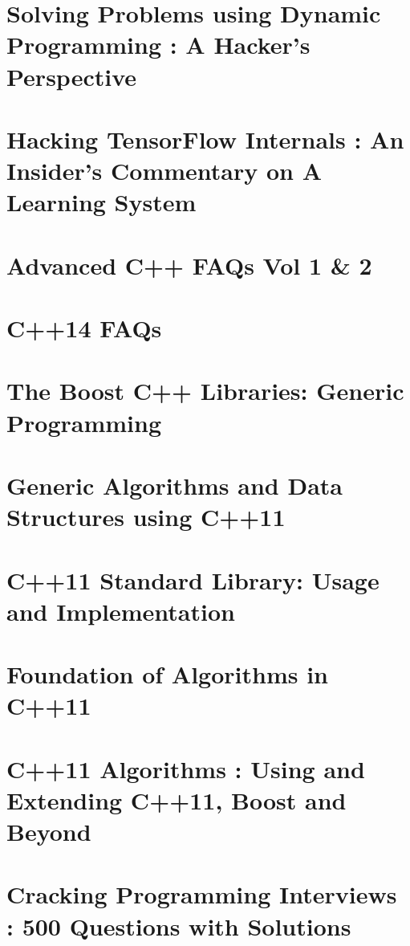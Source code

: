 \documentclass[makeidx, 12pt, oneside, onecolumn, openright, final, svgnames, dvipsnames, extrafontsizes]{memoir}
\theoremstyle{problemstyle}
\begin{document}
\chapter{Solving Problems using Dynamic Programming : A Hacker’s Perspective}



\chapter{Hacking TensorFlow Internals : An Insider’s Commentary on A Learning System}

\chapter{Advanced C++ FAQs Vol 1 \& 2}

\chapter{C++14 FAQs}

\chapter{The Boost C++ Libraries: Generic Programming}

\chapter{Generic Algorithms and Data Structures using C++11}

\chapter{C++11 Standard Library: Usage and Implementation}

\chapter{Foundation of Algorithms in C++11}

\chapter{C++11 Algorithms : Using and Extending C++11, Boost and Beyond}

\chapter{Cracking Programming Interviews : 500 Questions with Solutions}
\end{document}
